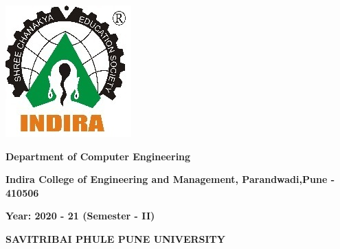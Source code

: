\begin{titlepage}
\begin{center}
\begin{center} \includegraphics[scale=0.65]{./ilogo} \end{center}

\vspace{-.8cm}
\begin{center}\textbf{{ {\large Department of Computer Engineering}}}\end{center}
\vspace{-.8cm}
\begin{center}\textbf{{ {\large Indira College of Engineering and Management, Parandwadi,Pune - 410506}}} \end{center}
\vspace{-.8cm}
\begin{center}{ \textbf{{\large Year: 2020 - 21 (Semester - II)}}}\end{center}
\vspace{-.8cm}
\begin{center}{ \textbf{{\large SAVITRIBAI PHULE PUNE UNIVERSITY}}}\end{center}
\end{center}
\end{titlepage}
\newpage